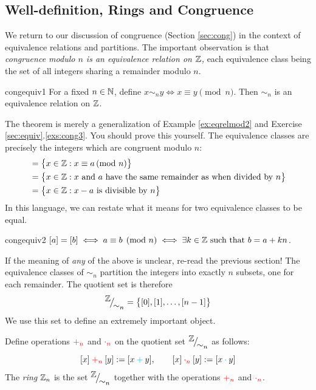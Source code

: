 \clearpage


\subsection{Well-definition, Rings and Congruence}\label{sec:welldefn}

We return to our discussion of congruence (Section \ref{sec:cong}) in the context of equivalence relations and partitions. The important observation is that \emph{congruence modulo $n$ is an equivalence relation on $\mathbb{Z}$,} each equivalence class being the set of all integers sharing a remainder modulo $n$.

\begin{thm}{}{congequiv1}
	For a fixed $n\in\mathbb{N}$, define $x\sim_n y\iff x\equiv y\pmod n$. Then $\sim_n$ is an equivalence relation on $\mathbb{Z}$.
\end{thm}

The theorem is merely a generalization of Example \ref{ex:eqrelmod2} and Exercise \ref*{sec:equiv}.\ref{exs:cong3}. You should prove this yourself. The equivalence classes are precisely the integers which are congruent modulo $n$:
\begin{align*}
	[a]&=\bigl\{x\in\Z:x\equiv a\spmod n\bigr\}\\
	&=\bigl\{x\in\Z:x\text{ and $a$ have the same remainder as when divided by $n$}\bigr\}\\
	&=\bigl\{x\in\Z:x-a\text{ is divisible by $n$}\bigr\}
\end{align*}
In this language, we can restate what it means for two equivalence classes to be equal.

\begin{thm}{}{congequiv2}
	$[a]=[b]\iff a\equiv b\pmod n\iff \exists k\in\mathbb{Z}\text{ such that }b=a+kn$.
\end{thm}

If the meaning of \emph{any} of the above is unclear, re-read the previous section! The equivalence classes of $\sim_n$ partition the integers  into  exactly $n$ subsets, one for each remainder. The quotient set is therefore
\[
	{}^{\textstyle {\mathbb{Z}}}\!\big/_{\textstyle \!{\sim_n}}=\bigl\{[0],[1],\ldots,[n-1]\bigr\}
\]
We use this set to define an extremely important object.

\begin{defn}{}{}
	Define operations $\textcolor{red}{+_n}$ and $\textcolor{red}{\cdot_n}$ on the quotient set ${}^{\textstyle {\mathbb{Z}}}\!\big/_{\textstyle \!{\sim_n}}$ as follows:
	\[
		[x]\mathbin{\textcolor{red}{+_n}}[y]:=[x\mathbin{\textcolor{cyan}{+}}y],\qquad [x]\mathbin{\textcolor{red}{\cdot_n}}[y]:=[x\mathbin{\textcolor{cyan}{\cdot}} y]
	\]
	The \emph{ring} $\mathbb{Z}_n$ is the set ${}^{\textstyle {\mathbb{Z}}}\!\big/_{\textstyle \!{\sim_n}}$ together with the operations $\textcolor{red}{+_n}$ and $\textcolor{red}{\cdot_n}$.
\end{defn}

